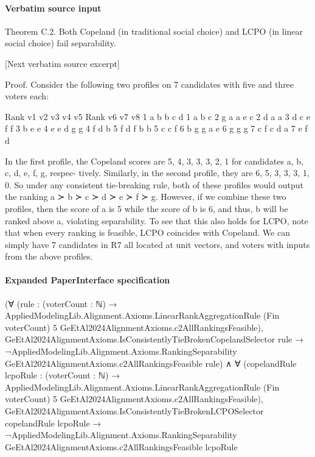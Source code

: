 \documentclass[10pt]{article}
\begin{document}
\paragraph{Verbatim source input}
\begin{ReviewVerbatim}
Theorem C.2. Both Copeland (in traditional social choice) and LCPO (in linear social choice) fail
separability.

[Next verbatim source excerpt]

Proof. Consider the following two profiles on 7 candidates with five and three voters each:

                    Rank     v1    v2    v3        v4    v5           Rank     v6   v7   v8
                      1       a     b    b         c     d                 1   a    b    c
                      2       g     a    a         e     c                 2   d    a    a
                      3       d     c    e         f     f                 3   b    e    e
                      4       e     e    d         g     g                 4   f    d    b
                      5       f     d    f         b     b                 5   c    c    f
                      6       b     g    g         a     e                 6   g    g    g
                      7       c     f    c         d     a                 7   e    f    d

In the first profile, the Copeland scores are 5, 4, 3, 3, 3, 2, 1 for candidates a, b, c, d, e, f, g, respec-
tively. Similarly, in the second profile, they are 6, 5, 3, 3, 3, 1, 0. So under any consistent tie-breaking
rule, both of these profiles would output the ranking a ≻ b ≻ c ≻ d ≻ e ≻ f ≻ g.
However, if we combine these two profiles, then the score of a is 5 while the score of b is 6, and
thus, b will be ranked above a, violating separability.
To see that this also holds for LCPO, note that when every ranking is feasible, LCPO coincides with
Copeland. We can simply have 7 candidates in R7 all located at unit vectors, and voters with inputs
from the above profiles.
\end{ReviewVerbatim}



\paragraph{Expanded PaperInterface specification}
\begin{ReviewVerbatim}
(∀
    (rule :
      (voterCount : ℕ) →
        AppliedModelingLib.Alignment.Axioms.LinearRankAggregationRule (Fin voterCount) 5
          GeEtAl2024AlignmentAxioms.c2AllRankingsFeasible),
    GeEtAl2024AlignmentAxioms.IsConsistentlyTieBrokenCopelandSelector rule →
      ¬AppliedModelingLib.Alignment.Axioms.RankingSeparability GeEtAl2024AlignmentAxioms.c2AllRankingsFeasible rule) ∧
  ∀
    (copelandRule lcpoRule :
      (voterCount : ℕ) →
        AppliedModelingLib.Alignment.Axioms.LinearRankAggregationRule (Fin voterCount) 5
          GeEtAl2024AlignmentAxioms.c2AllRankingsFeasible),
    GeEtAl2024AlignmentAxioms.IsConsistentlyTieBrokenLCPOSelector copelandRule lcpoRule →
      ¬AppliedModelingLib.Alignment.Axioms.RankingSeparability GeEtAl2024AlignmentAxioms.c2AllRankingsFeasible lcpoRule
\end{ReviewVerbatim}
\end{document}

